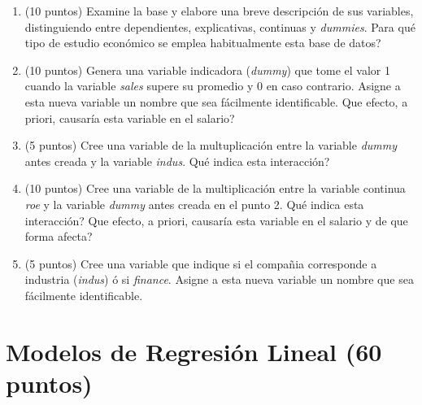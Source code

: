 \documentclass[letterpaper,11pt]{article}
\begin{document}
\begin{enumerate}

\item (10 puntos) Examine la base y elabore una breve descripción de sus variables, distinguiendo entre dependientes, explicativas, continuas y \textit{dummies}. \textquestiondown Para qué tipo de estudio económico se emplea habitualmente esta base de datos?



    \item (10 puntos) Genera una variable indicadora (\textit{dummy}) que tome el valor 1 cuando la variable \textit{sales} supere su promedio y 0 en caso contrario. Asigne a esta nueva variable un nombre que sea fácilmente identificable. \textquestiondown Que efecto, a priori, causaría esta variable en el salario?
    


    \item (5 puntos) Cree una variable de la multuplicación entre la variable \textit{dummy} antes creada y la variable \textit{indus}. \textquestiondown Qué indica esta interacción? 




    \item (10 puntos) Cree una variable de la multiplicación entre la variable continua \textit{roe}  y la variable \textit{dummy} antes creada en el punto 2. \textquestiondown Qué indica esta interacción? \textquestiondown Que efecto, a priori, causaría esta variable en el salario y de que forma afecta?



    \item (5 puntos) Cree una variable que indique si el compañia corresponde a industria (\textit{indus}) ó si \textit{finance}.  Asigne a esta nueva variable un nombre que sea fácilmente identificable.



\end{enumerate}

\section{Modelos de Regresión Lineal (60 puntos)}
\end{document}

